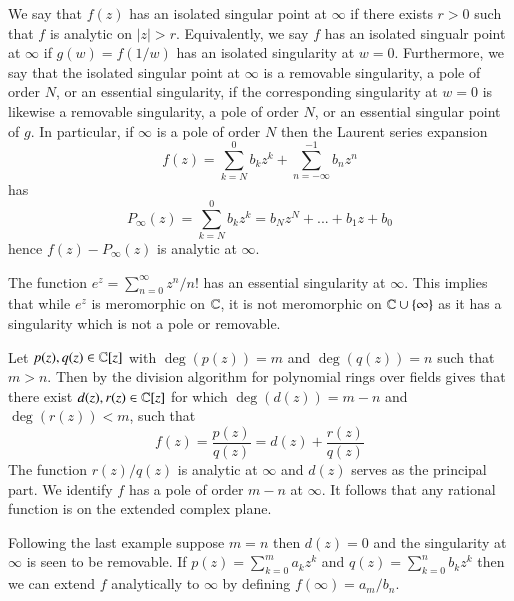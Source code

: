 \begin{definition}
    We say that $f(z)$ has an isolated singular point at $\infty$ if there exists $r > 0$ such that $f$ is analytic on $|z| > r$. Equivalently, we say $f$ has an isolated singualr point at $\infty$ if $g(w) = f(1/w)$ has an isolated singularity at $w = 0$. Furthermore, we say that the isolated singular point at $\infty$ is a removable singularity, a pole of order $N$, or an essential singularity, if the corresponding singularity at $w=0$ is likewise a removable singularity, a pole of order $N$, or an essential singular point of $g$. In particular, if $\infty$ is a pole of order $N$ then the Laurent series expansion \begin{equation*}
        f(z) = \sum_{k=N}^0b_kz^k + \sum_{n=-\infty}^{-1}b_nz^n
    \end{equation*}
    has  \begin{equation*}
        P_{\infty}(z) = \sum_{k=N}^0b_kz^k = b_Nz^N+...+b_1z+b_0
    \end{equation*}
    hence $f(z) - P_{\infty}(z)$ is analytic at $\infty$.
\end{definition}

\begin{example}
    The function $e^z = \sum_{n=0}^{\infty}z^n/n!$ has an essential singularity at $\infty$. This implies that while $e^z$ is meromorphic on $\mathbb C$, it is not meromorphic on $\mathbb C\cup \{\infty\}$ as it has a singularity which is not a pole or removable.
\end{example}

\begin{example}
    Let $p(z),q(z) \in \mathbb C[z]$ with $\deg(p(z)) = m$ and $\deg(q(z)) = n$ such that $m > n$. Then by the division algorithm for polynomial rings over fields gives that there exist $d(z),r(z) \in \mathbb C[z]$ for which $\deg(d(z)) = m-n$ and $\deg(r(z)) < m$, such that \begin{equation*}
        f(z) = \frac{p(z)}{q(z)} = d(z) + \frac{r(z)}{q(z)}
    \end{equation*}
    The function $r(z)/q(z)$ is analytic at $\infty$ and $d(z)$ serves as the principal part. We identify $f$ has a pole of order $m-n$ at $\infty$. It follows that any rational function is  on the extended complex plane.
\end{example}

\begin{example}
    Following the last example suppose $m = n$ then $d(z) = 0$ and the singularity at $\infty$ is seen to be removable. If $p(z) = \sum_{k=0}^ma_kz^k$ and $q(z) = \sum_{k=0}^nb_kz^k$ then we can extend $f$ analytically to $\infty$ by defining $f(\infty) = a_m/b_n$.
\end{example}


